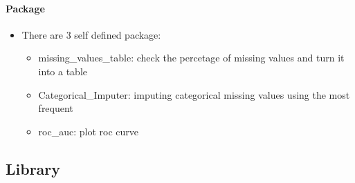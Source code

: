 \documentclass[11pt]{article}
\providecommand{\tightlist}{%
      \setlength{\itemsep}{0pt}\setlength{\parskip}{0pt}}
\begin{document}
    \hypertarget{package}{%
\paragraph{Package}\label{package}}

\begin{itemize}
\tightlist
\item
  There are 3 self defined package:

  \begin{itemize}
  \tightlist
  \item
    missing\_values\_table: check the percetage of missing values and
    turn it into a table
  \item
    Categorical\_Imputer: imputing categorical missing values using the
    most frequent
  \item
    roc\_auc: plot roc curve
  \end{itemize}
\end{itemize}

    \hypertarget{library}{%
\subsection{Library}\label{library}}
\end{document}
